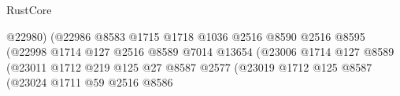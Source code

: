 \begin{lexlean}{RustCore}
\begin{coremodule}
                                                              @22980)
                                                            (@22986
                                                              @8583
                                                              @1715
                                                              @1718
                                                              @1036
                                                              @2516
                                                              @8590
                                                              @2516
                                                              @8595
                                                              (@22998
                                                                @1714
                                                                @127
                                                                @2516
                                                                @8589
                                                                @7014
                                                                @13654
                                                                (@23006
                                                                  @1714
                                                                  @127
                                                                  @8589
                                                                  (@23011
                                                                    @1712
                                                                    @219
                                                                    @125
                                                                    @27
                                                                    @8587
                                                                    @2577
                                                                    (@23019
                                                                      @1712
                                                                      @125
                                                                      @8587
                                                                      (@23024
                                                                        @1711
                                                                        @59
                                                                        @2516
                                                                        @8586

\end{coremodule}
\end{lexlean}
